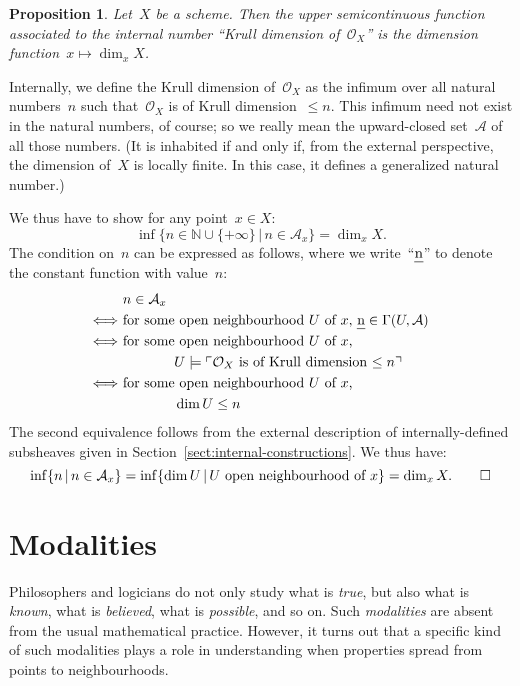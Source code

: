 \documentclass[10pt,reqno,a4paper]{amsbook}
\makeatletter
\theoremstyle{definition}
\theoremstyle{plain}
\newtheorem{prop}[defn]{Proposition}
\theoremstyle{remark}
\newcommand{\A}{\mathcal{A}}
\renewcommand{\O}{\mathcal{O}}
\newcommand{\NN}{\mathbb{N}}
\let\oldul\ul
\renewcommand{\ul}[1]{\text{\oldul{$#1$}}}
\newcommand{\?}{\,{:}\,}
\renewcommand{\_}{\mathpunct{.}\,}
\newcommand{\speak}[1]{\ulcorner\text{\textnormal{#1}}\urcorner}
\renewenvironment{proof}[1][\proofname]{\par
  \pushQED{\qed}%
  \normalfont \topsep6\p@\@plus6\p@\relax
  \trivlist
  \item[\hskip\labelsep
        \itshape
    #1\@addpunct{.}]\ignorespaces
}{%
  \popQED\endtrivlist\@endpefalse
}
\makeatother
\begin{document}
\begin{prop}Let~$X$ be a scheme. Then the upper semicontinuous function
associated to the internal number ``Krull dimension of~$\O_X\!$'' is the
dimension function~$x \mapsto \dim_x X$.\end{prop}
\begin{proof}Internally, we define the Krull dimension of~$\O_X$ as the infimum
over all natural numbers~$n$ such that~$\O_X$ is of Krull
dimension~$\leq n$. This infimum need not exist in the natural numbers, of
course; so we really mean the upward-closed set~$\A$ of all those numbers. (It
is inhabited if and only if, from the external perspective, the dimension
of~$X$ is locally finite. In this case, it defines a generalized natural number.)

We thus have to show for any point~$x \in X$:
\[ \inf\{ n \in \NN \cup \{+\infty\} \,|\, n \in \A_x \} =
  \dim_x X. \]
The condition on~$n$ can be expressed as follows, where we write~``$\ul{n}$''
to denote the constant function with value~$n$:
\begin{align*}
  &\ n \in \A_x \\
  \Longleftrightarrow &\
  \text{for some open neighbourhood~$U$ of~$x$, $\ul{n} \in \Gamma(U,\A)$} \\
  \Longleftrightarrow &\
  \text{for some open neighbourhood~$U$ of~$x$,} \\
  & \qquad\qquad U \models \speak{$\O_X$ is of Krull dimension~$\leq n$} \\
  \Longleftrightarrow &\
  \text{for some open neighbourhood~$U$ of~$x$,} \\
  & \qquad\qquad \dim U \leq n
\end{align*}
The second equivalence follows from the external description of internally-defined
subsheaves given in Section~\ref{sect:internal-constructions}.
We thus have:
\[
  \inf\{ n \,|\, n \in \A_x \} =
    \inf\{ \dim U \,|\, \text{$U$ open neighbourhood of~$x$} \}
  = \dim_x X. \qedhere
\]
\end{proof}


\section{Modalities}
\label{sect:modalities}

Philosophers and logicians do not only study what is \emph{true}, but also what
is \emph{known}, what is \emph{believed}, what is \emph{possible}, and so on.
Such \emph{modalities} are absent from the usual mathematical practice.
However, it turns out that a specific kind of such modalities plays a role in
understanding when properties spread from points to neighbourhoods.
\end{document}
